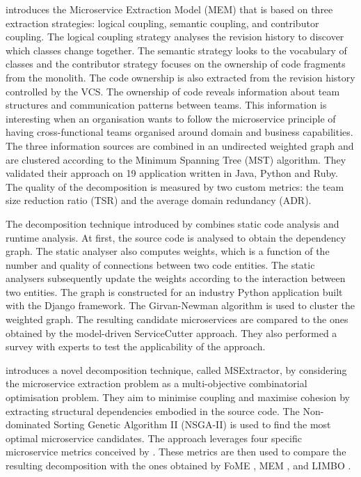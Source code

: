 \citeauthor{mazlami2017extraction} \cite{mazlami2017extraction} introduces the Microservice Extraction Model (MEM) that is based on three extraction strategies: logical coupling, semantic coupling, and contributor coupling. The logical coupling strategy analyses the revision history to discover which classes change together. The semantic strategy looks to the vocabulary of classes and the contributor strategy focuses on the ownership of code fragments from the monolith. The code ownership is also extracted from the revision history controlled by the VCS. The ownership of code reveals information about team structures and communication patterns between teams. This information is interesting when an organisation wants to follow the microservice principle of having cross-functional teams organised around domain and business capabilities. The three information sources are combined in an undirected weighted graph and are clustered according to the Minimum Spanning Tree (MST) algorithm. They validated their approach on 19 application written in Java, Python and Ruby. The quality of the decomposition is measured by two custom metrics: the team size reduction ratio (TSR) and the average domain redundancy (ADR). \par
The decomposition technique introduced by \citeauthor{matias2020determining} \cite{matias2020determining} combines static code analysis and runtime analysis. At first, the source code is analysed to obtain the dependency graph. The static analyser also computes weights, which is a function of the number and quality of connections between two code entities. The static analysers subsequently update the weights according to the interaction between two entities. The graph is constructed for an industry Python application built with the Django framework. The Girvan-Newman algorithm is used to cluster the weighted graph. The resulting candidate microservices are compared to the ones obtained by the model-driven ServiceCutter \cite{gysel2016service} approach. They also performed a survey with experts to test the applicability of the approach. \par
\citeauthor{saidani2019towards} \cite{saidani2019towards} introduces a novel decomposition technique, called MSExtractor, by considering the microservice extraction problem as a multi-objective combinatorial optimisation problem. They aim to minimise coupling and maximise cohesion by extracting structural dependencies embodied in the source code. The Non-dominated Sorting Genetic Algorithm II (NSGA-II) is used to find the most optimal microservice candidates. The approach leverages four specific microservice metrics conceived by \cite{jin2018functionality}. These metrics are then used to compare the resulting decomposition with the ones obtained by FoME \cite{jin2018functionality}, MEM \cite{mazlami2017extraction}, and LIMBO \cite{andritsos2005information}. \par
